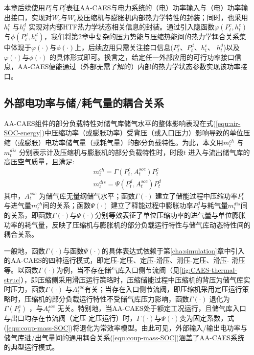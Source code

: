 本章后续使用$P_t^c$与$P_t^d$表征AA-CAES与电力系统的（电）功率输入与（电）功率输出接口，实现对$W_c$与$W_e$及压缩机与膨胀机内部热力学特性的封装；同时，也采用$h_t^c$ 与$h_t^d$ 实现对内部HTF热力学状态相关信息的封装。通过引入隐函数$\varphi ({P_t^c,h_t^c})$与$\phi ({P_t^d,h_t^d})$，我们将第2章中复杂的压力势能与压缩热能间的热力学耦合关系集中体现于$\varphi(\cdot) $与$\phi(\cdot)$上，后续应用只需关注接口信息($ P_t^c$、$P_t^d$、$h_t^c$、 $h_t^d$)以及$\varphi(\cdot)$与$\phi(\cdot)$ 的具体形式即可。换言之，给定任一外部应用的可行功率接口信息，AA-CAES便能通过（外部无需了解的）内部的热力学状态参数实现该功率接口。

\subsection{外部电功率与储/耗气量的耦合关系}
AA-CAES组件的部分负载特性对储气库储气水平的整体影响表现在式(\ref{equ:air-SOC-energy})中压缩功率（或膨胀功率）受背压（或入口压力）影响导致的单位压缩（或膨胀）电功率储气量（或耗气量）的部分负载特性。为此，本文用$m_t^{ch}$ 与$m_t^{dis}$ 分别表示计及压缩机与膨胀机的部分负载特性时，时段$t$ 进入与流出储气库的高压空气质量，且满足:
\begin{subequations}
\label{equ:coup-mass-SOC}
\begin{gather}
m_t^{ch} = \Gamma({P_t^c,A_t^{soc}})P_t^c\label{equ:coup-mass-SOC-char}\\
m_t^{dis} = \Psi({P_t^d,A_t^{soc}})P_t^d \label{equ:coup-mass-SOC-disc}
\end{gather}
\end{subequations}
其中，$A_t^{soc}$ 为储气库无量纲储气水平；函数$\Gamma(\cdot)$ 建立了储能过程中压缩功率$P_t^c$ 与进气量$m_t^{ch}$间的关系；函数$\Psi(\cdot)$ 建立了释能过程中膨胀功率$P_t^d$与耗气量$m_t^{dis}$间的关系，即函数$\Gamma (\cdot)$与$\Psi(\cdot)$分别等效表征了单位压缩功率的进气量与单位膨胀功率的耗气量，反映了压缩机与膨胀机的部分负载运行特性与储气库动态特性间的耦合关系。

一般地，函数$\Gamma(\cdot)$与函数$\Psi(\cdot)$的具体表达式依赖于第\ref{cha:simulation}章中引入的AA-CAES的四种运行模式，即定压-定压、定压-滑压、滑压-定压、滑压- 滑压等。以函数$\Gamma(\cdot)$为例，当不存在储气库入口侧节流阀（见\ref{fig:CAES-thermal-struc}），即压缩侧采用滑压运行策略时，压缩储能过程中压缩机的背压为储气库实时压力，函数$\Gamma(\cdot)$ 与$A_t^{soc}$有关；当存在入口侧节流阀，即压缩机采用定压运行策略时，压缩机的部分负载运行特性不受储气库压力影响，函数$\Gamma(\cdot)$ 退化为$\Gamma (P_t^c)$ ，与$A_t^{soc}$ 无关。特别地，当AA-CAES处于额定工况运行，且储气库入口与出口均存在节流阀（定压-定压运行）时，$\Gamma(\cdot)$与$\Psi(\cdot)$变为固定系数，式(\ref{equ:coup-mass-SOC})将退化为常效率模型。由此可见，外部输入/输出电功率与储气库进/出气量间的通用耦合关系(\ref{equ:coup-mass-SOC})涵盖了AA-CAES系统的典型运行模式。

